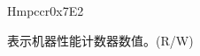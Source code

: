\begin{register}{H}{mpccr}{0x7E2}\label{regdesc:MPCCR}
%
\regnewline%
\begin{regdesc}\begin{reglist}
\label{fielddesc:MPCCR}\item [MPCCR] 表示机器性能计数器数值。(R/W)
\end{reglist}\end{regdesc}
\end{register}
